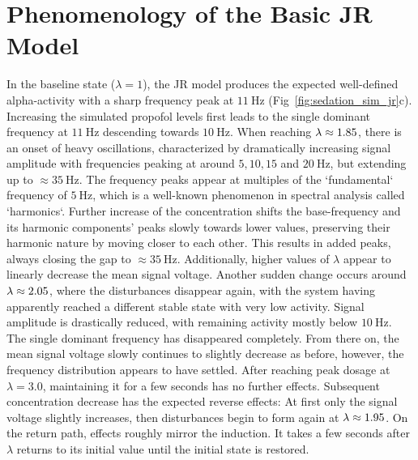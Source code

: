 \section{Phenomenology of the Basic JR Model}\label{sec:phenomenology-of-the-basic-jr-model}
In the baseline state ($\lambda = 1$), the JR model produces the expected well-defined alpha-activity
    with a sharp frequency peak at $\SI{11}{\hertz}$ (Fig~\ref{fig:sedation_sim_jr}c).
    Increasing the simulated propofol levels first leads to the single dominant frequency at $\SI{11}{\hertz} $
    descending towards $\SI{10}{\hertz} $.
    When reaching $\lambda \approx 1.85 $,
    there is an onset of heavy oscillations, characterized by dramatically increasing signal amplitude
    with frequencies peaking at around $5, 10, 15$ and $ \SI{20}{\hertz} $,
    but extending up to $\approx \SI{35}{\hertz} $.
    The frequency peaks appear at multiples of the `fundamental` frequency of $\SI{5}{\hertz}$,
    which is a well-known phenomenon in spectral analysis called `harmonics`.
    Further increase of the concentration shifts the base-frequency and its harmonic components' peaks
    slowly towards lower values, preserving their harmonic nature by moving closer to each other.
    This results in added peaks, always closing the gap to $\approx \SI{35}{\hertz} $.
    Additionally, higher values of $\lambda$ appear to linearly decrease the mean signal voltage.
    Another sudden change occurs around $\lambda \approx 2.05 $,
    where the disturbances disappear again,
    with the system having apparently reached a different stable state with very low activity.
    Signal amplitude is drastically reduced, with remaining activity mostly below $\SI{10}{\hertz}$.
    The single dominant frequency has disappeared completely.
    From there on, the mean signal voltage slowly continues to slightly decrease as before,
    however, the frequency distribution appears to have settled.
    After reaching peak dosage at $\lambda = 3.0$, maintaining it for a few seconds has no further effects.
    Subsequent concentration decrease has the expected reverse effects:
    At first only the signal voltage slightly increases,
    then disturbances begin to form again at $\lambda \approx 1.95$.
    On the return path, effects roughly mirror the induction.
    It takes a few seconds after $\lambda$ returns to its initial value until the initial state is restored.

